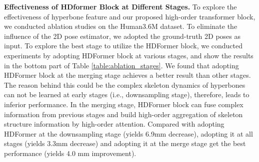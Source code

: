\documentclass{article}
\begin{document}
\begin{table}
    \centering
    \scriptsize
    \caption{\small Ablation study of the effectiveness of HDFormer at different stages. We compared the results of the baseline (UGCN~\protect\cite{wang2020-motion}), our HDFormer, and different configurations for our HDFormer on Human3.6M. The  denotes the improvements compared with the baseline.}
    \label{table:ablation_stages}
\end{table}

\noindent \textbf{Effectiveness of HDformer Block at Different Stages.} To explore the effectiveness of hyperbone feature and our proposed high-order transformer block, we conducted ablation studies on the Human3.6M dataset. To eliminate the influence of the 2D pose estimator, we adopted the ground-truth 2D poses as input. To explore the best stage to utilize the HDFormer block, we conducted experiments by adopting HDFormer block at various stages, and show the results in the bottom part of Table \ref{table:ablation_stages}. We found that adopting HDFormer block at the merging stage achieves a better result than other stages. The reason behind this could be the complex skeleton dynamics of hyperbones can not be learned at early stages (i.e., downsampling stage), therefore, leads to inferior performance. In the merging stage, HDFormer block can fuse complex information from previous stages and build high-order aggregation of skeleton structure information by high-order attention. Compared with adopting HDFormer at the downsampling stage (yields 6.9mm decrease), adopting it at all stages (yields 3.3mm decrease) and adopting it at the merge stage get the best performance (yields 4.0 mm improvement).
\end{document}
